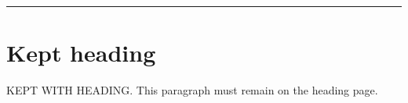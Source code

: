 \documentclass[draft]{pnuthesis2026}
\begin{document}
\PNUStartBody
\noindent\rule{10mm}{.84\textheight}\par
\PNUKeepHeading[12\baselineskip]
\section*{Kept heading}
KEPT WITH HEADING. This paragraph must remain on the heading page.
\end{document}
